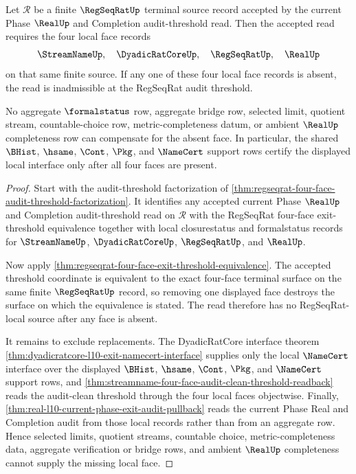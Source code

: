 \begin{theorem}
\label{thm:regseqrat-audit-threshold-missing-face-obstruction}
Let $\mathcal R$ be a finite $\RegSeqRatUp$ terminal source record accepted by the current Phase $\RealUp$ and Completion audit-threshold read. Then the accepted read requires the four local face records
$$
\StreamNameUp,\quad \DyadicRatCoreUp,\quad \RegSeqRatUp,\quad \RealUp
$$
on that same finite source. If any one of these four local face records is absent, the read is inadmissible at the RegSeqRat audit threshold.

No aggregate $\formalstatus$ row, aggregate bridge row, selected limit, quotient stream, countable-choice row, metric-completeness datum, or ambient $\RealUp$ completeness row can compensate for the absent face. In particular, the shared $\BHist$, $\hsame$, $\Cont$, $\Pkg$, and $\NameCert$ support rows certify the displayed local interface only after all four faces are present.
\end{theorem}
\begin{proof}
Start with the audit-threshold factorization of \autoref{thm:regseqrat-four-face-audit-threshold-factorization}. It identifies any accepted current Phase $\RealUp$ and Completion audit-threshold read on $\mathcal R$ with the RegSeqRat four-face exit-threshold equivalence together with local closurestatus and formalstatus records for $\StreamNameUp$, $\DyadicRatCoreUp$, $\RegSeqRatUp$, and $\RealUp$.

Now apply \autoref{thm:regseqrat-four-face-exit-threshold-equivalence}. The accepted threshold coordinate is equivalent to the exact four-face terminal surface on the same finite $\RegSeqRatUp$ record, so removing one displayed face destroys the surface on which the equivalence is stated. The read therefore has no RegSeqRat-local source after any face is absent.

It remains to exclude replacements. The DyadicRatCore interface theorem \autoref{thm:dyadicratcore-l10-exit-namecert-interface} supplies only the local $\NameCert$ interface over the displayed $\BHist$, $\hsame$, $\Cont$, $\Pkg$, and $\NameCert$ support rows, and \autoref{thm:streamname-four-face-audit-clean-threshold-readback} reads the audit-clean threshold through the four local faces objectwise. Finally, \autoref{thm:real-l10-current-phase-exit-audit-pullback} reads the current Phase Real and Completion audit from those local records rather than from an aggregate row. Hence selected limits, quotient streams, countable choice, metric-completeness data, aggregate verification or bridge rows, and ambient $\RealUp$ completeness cannot supply the missing local face.
\end{proof}

